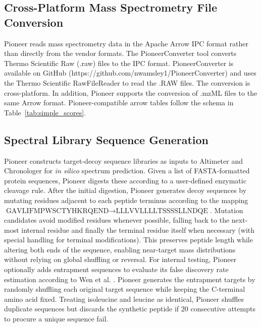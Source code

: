 \documentclass[pdflatex,sn-nature]{sn-jnl}
\begin{document}


\subsection{Cross-Platform Mass Spectrometry File Conversion}\label{subsec1}

Pioneer reads mass spectrometry data in the Apache Arrow IPC format rather than directly from the vendor formats. The PioneerConverter tool converts Thermo Scientific Raw (.raw) files to the IPC format. PioneerConverter is available on GitHub (https://github.com/nwamsley1/PioneerConverter) and uses the Thermo Scientific RawFileReader to read the .RAW files. The conversion is cross-platform. In addition, Pioneer supports the conversion of .mzML files to the same Arrow format. Pioneer-compatible arrow tables follow the schema in Table~\ref{tab:simple_scores}. 

\subsection{Spectral Library Sequence Generation}\label{subsec2}
Pioneer constructs target-decoy sequence libraries as inputs to Altimeter and Chronologer for \textit{in silico} spectrum prediction. Given a list of FASTA-formatted protein sequences, Pioneer digests these according to a user-defined enzymatic cleavage rule. After the initial digestion, Pioneer generates decoy sequences by mutating residues adjacent to each peptide terminus according to the mapping $\text{GAVLIFMPWSCTYHKRQEND} \rightarrow \text{LLLVVLLLLTSSSSLLNDQE}$. Mutation candidates avoid modified residues whenever possible, falling back to the next-most internal residue and finally the terminal residue itself when necessary (with special handling for terminal modifications). This preserves peptide length while altering both ends of the sequence, enabling near-target mass distributions without relying on global shuffling or reversal. For internal testing, Pioneer optionally adds entrapment sequences to evaluate its false discovery rate estimation according to Wen et al. \cite{Wen2024-jv}. Pioneer generates the entrapment targets by randomly shuffling each original target sequence while keeping the C-terminal amino acid fixed. Treating isoleucine and leucine as identical, Pioneer shuffles duplicate sequences but discards the synthetic peptide if 20 consecutive attempts to procure a unique sequence fail.
\end{document}
